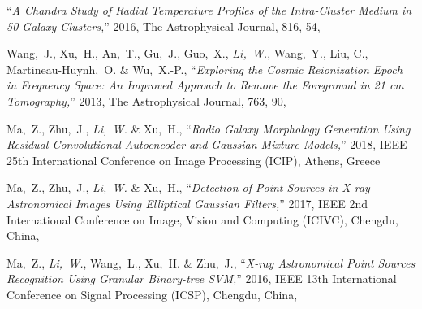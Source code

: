 \begin{publications}{99}
    \enquote{\it A Chandra Study of Radial Temperature Profiles of the
      Intra-Cluster Medium in 50 Galaxy Clusters,}
    2016, The Astrophysical Journal, 816, 54,
  \item Wang,~J., Xu,~H., An,~T., Gu,~J., Guo,~X., \emph{Li,~W.},
    Wang,~Y., Liu, C., Martineau-Huynh,~O. \& Wu,~X.-P.,
    \enquote{\it Exploring the Cosmic Reionization Epoch in Frequency
      Space: An Improved Approach to Remove the Foreground in 21 cm
      Tomography,}
    2013, The Astrophysical Journal, 763, 90,
  \item Ma,~Z., Zhu,~J., \emph{Li,~W.} \& Xu,~H.,
    \enquote{\it Radio Galaxy Morphology Generation Using Residual
      Convolutional Autoencoder and Gaussian Mixture Models,}
    2018, IEEE 25th International Conference on Image Processing (ICIP),
    Athens, Greece
  \item Ma,~Z., Zhu,~J., \emph{Li,~W.} \& Xu,~H.,
    \enquote{\it Detection of Point Sources in X-ray Astronomical Images
      Using Elliptical Gaussian Filters,}
    2017, IEEE 2nd International Conference on Image, Vision and Computing (ICIVC),
    Chengdu, China,
  \item Ma,~Z., \emph{Li,~W.}, Wang,~L., Xu,~H. \& Zhu,~J.,
    \enquote{\it X-ray Astronomical Point Sources Recognition Using
      Granular Binary-tree SVM,}
    2016, IEEE 13th International Conference on Signal Processing (ICSP),
    Chengdu, China,
\end{publications}

